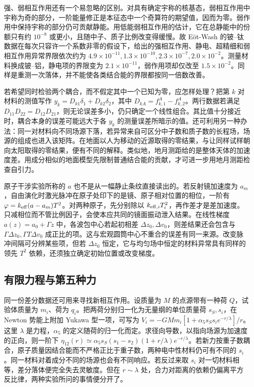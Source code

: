 强、弱相互作用还有一个易忽略的区别。对具有确定宇称的核基态，弱相互作用中宇称为奇的部分，一阶能量修正是本征态中一个奇算符的期望值，因而为零。弱作用中保持宇称的部分仍可贡献静能。用低能弱相互作用的估计，它在总静能中的份额只有约 $10^{-8}$ 或更小，且随中子、质子比例改变得缓慢。故 Eöt-Wash 的铍--钛数据在每次只容许一个系数非零的假设下，给出的强相互作用、静电、超精细和弱相互作用异常界限依次约为 $4.9\times10^{-11},1.3\times10^{-10},2.3\times10^{-7},2.0\times10^{-2}$。测量材料换成铍--铝，静电项的界限变为 $2.1\times10^{-11}$，弱作用项却仅改至 $1.5\times10^{-2}$。同样是重测一次落体，并不能使各类结合能的界限都按同一倍数改善。

若希望同时检验两个耦合，而不假定其中一个已知为零，应怎样处理？把第 $k$ 对材料的测值写作 $y_k=D_{k1}\delta_1+D_{k2}\delta_2$，其中 $D_{kA}=f^A_{k,1}-f^A_{k,2}$。两行数据若满足 $D_{11}D_{22}=D_{12}D_{21}$，则无论误差多小，仍只确定一个线性组合。其比值十分接近时，耦合本身的误差可能远大于各 $y_k$ 的测量误差所暗示的值。还可利用另一种办法：同一对材料向不同场源下落，若异常来自可区分中子数和质子数的长程场，场源的组成也进入该矩阵。在地面以人为移动的近源取得的零结果，与让同样试样朝向太阳取得的零结果，便有不同的解释。类似地，地月测距给的是整体天体的加速度差。用成分相似的地面模型先限制普通结合能的贡献，才可进一步用地月测距检查自引力。

原子干涉实验所称的 $a$ 也不是从一幅静止条纹直接读出的。若反射镜加速度为 $a_m$，自由演化时激光脉冲在原子处印下的是镜、原子相对位置的相位，一阶有 $\varphi=k_{\rm eff}(a-a_m)T^2$。对两种原子，先分别除以 $k_{{\rm eff},i}T_i^2$，再作差才是差加速度。只减相位而不管比例因子，会使本应共同的镜面振动泄入结果。在线性梯度 $a(z)=a_0+\Gamma z$ 中，各波包中心若起初相差 $\Delta z_0,\Delta v_0$，则差结果还会包含与 $\Gamma\Delta z_0,\Gamma T\Delta v_0$ 成正比的项。这与宏观圆筒中心不重合的误差有同一来源。改变脉冲间隔可分辨某些项，但若 $\Delta z_0$ 恒定，它与均匀场中恒定的材料异常具有同样的领先 $T^2$ 依赖，还须独立确定初始位置或改变梯度。

\subsection{有限力程与第五种力}

同一份差分数据还可用来寻找新相互作用。设质量为 $M$ 的点源带有一种荷 $Q$，试验体质量为 $m_i$、荷为 $q_i$。把两荷分别归一化为无量纲的单位质量荷 $s_S,s_i$，在 Newton 势能上附加 Yukawa 型一项，可写为 $V_i=-GMm_i[1+\alpha_5s_Ss_i e^{-r/\lambda}]/r$。这里 $\lambda$ 是力程，$\alpha_5$ 的定义随荷的归一化而定。求径向导数，以指向场源为加速度的正向，则一阶下 $\eta_{12}(r)\simeq \alpha_5 s_S(s_1-s_2) (1+r/\lambda)e^{-r/\lambda}$。若新力按重子数耦合，原子质量因结合能而不严格正比于重子数，两种电中性材料仍可有不同的 $s_i$。同一材料对着成分不同的场源也会有不同响应。若反过来取 $s_i$ 对一切材料相等，差分落体便完全失去灵敏度。但在 $r\sim\lambda$ 处，合力对距离的依赖仍偏离平方反比律，两种实验所问的事情便分开了。


